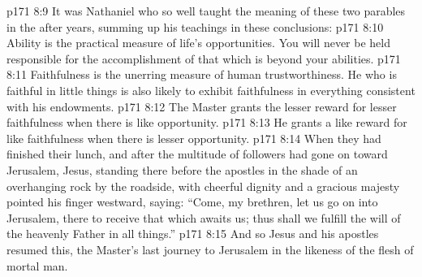 \vs p171 8:9 It was Nathaniel who so well taught the meaning of these two parables in the after years, summing up his teachings in these conclusions:
\pc \vs p171 8:10 \bibnobreakspace Ability is the practical measure of life’s opportunities. You will never be held responsible for the accomplishment of that which is beyond your abilities.
\pc \vs p171 8:11 \bibnobreakspace Faithfulness is the unerring measure of human trustworthiness. He who is faithful in little things is also likely to exhibit faithfulness in everything consistent with his endowments.
\pc \vs p171 8:12 \bibnobreakspace The Master grants the lesser reward for lesser faithfulness when there is like opportunity.
\pc \vs p171 8:13 \bibnobreakspace He grants a like reward for like faithfulness when there is lesser opportunity.
\pc \vs p171 8:14 When they had finished their lunch, and after the multitude of followers had gone on toward Jerusalem, Jesus, standing there before the apostles in the shade of an overhanging rock by the roadside, with cheerful dignity and a gracious majesty pointed his finger westward, saying: \textcolor{ubdarkred}{“Come, my brethren, let us go on into Jerusalem, there to receive that which awaits us; thus shall we fulfill the will of the heavenly Father in all things.”}\plusone
\vs p171 8:15 And so Jesus and his apostles resumed this, the Master’s last journey to Jerusalem in the likeness of the flesh of mortal man.
